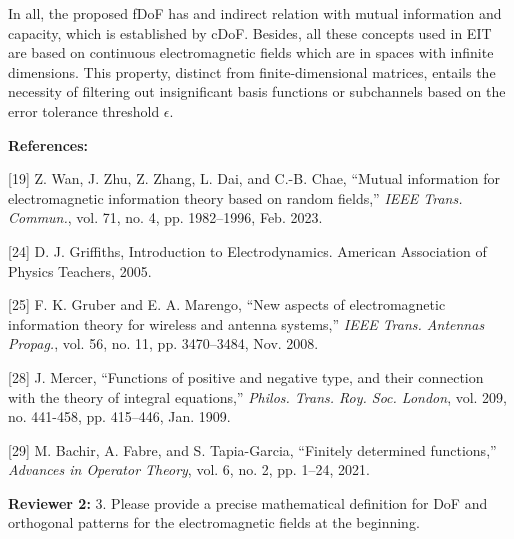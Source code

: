 \documentclass[a4paper,12pt]{article}
\begin{document}
\begin{framed}
{	\quad In all, the proposed fDoF has and indirect relation with mutual information and capacity, which is established by cDoF. Besides, all these concepts used in EIT are based on continuous electromagnetic fields which are in spaces with infinite dimensions. This property, distinct from finite-dimensional matrices, entails the necessity of filtering out insignificant basis functions or subchannels based on the error tolerance threshold $\epsilon$. 
	
}

    
\end{framed}

{\color{blue}
	{\bf References:}
	
	[19] Z. Wan, J. Zhu, Z. Zhang, L. Dai, and C.-B. Chae, “Mutual information for electromagnetic information theory based on random fields,” {\it IEEE Trans. Commun.}, vol. 71, no. 4, pp. 1982–1996, Feb. 2023.
	
	[24] D. J. Griffiths, Introduction to Electrodynamics. American Association of Physics Teachers, 2005.
	
	[25] F. K. Gruber and E. A. Marengo, “New aspects of electromagnetic information theory for wireless and antenna systems,” {\it IEEE Trans. Antennas Propag.}, vol. 56, no. 11, pp. 3470–3484, Nov. 2008.
	
	[28] J. Mercer, “Functions of positive and negative type, and their connection with the theory of integral equations,” {\it Philos. Trans. Roy. Soc. London}, vol. 209, no. 441-458, pp. 415–446, Jan. 1909.
	
	[29] M. Bachir, A. Fabre, and S. Tapia-Garcia, “Finitely determined functions,” {\it Advances in Operator Theory}, vol. 6, no. 2, pp. 1–24, 2021.
}

\textbf{Reviewer 2:}
3. Please provide a precise mathematical definition for DoF and orthogonal patterns for the electromagnetic fields at the beginning.

{}
\end{document}
